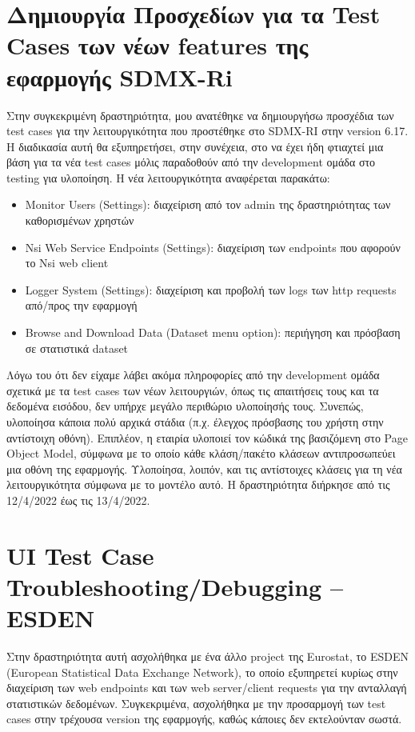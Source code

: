 \section*{Δημιουργία Προσχεδίων για τα Test Cases των νέων features της εφαρμογής SDMX-Ri}
Στην συγκεκριμένη δραστηριότητα, μου ανατέθηκε να δημιουργήσω προσχέδια των test cases για την λειτουργικότητα που προστέθηκε στο SDMX-RI στην 
version 6.17. Η διαδικασία αυτή θα εξυπηρετήσει, στην συνέχεια, στο να έχει ήδη φτιαχτεί μια βάση για τα νέα test cases μόλις παραδοθούν από 
την development ομάδα στο testing για υλοποίηση. Η νέα λειτουργικότητα αναφέρεται παρακάτω:
\begin{itemize}
    \item Monitor Users (Settings): διαχείριση από τον admin της δραστηριότητας των καθορισμένων χρηστών
    \item Nsi Web Service Endpoints (Settings): διαχείριση των endpoints που αφορούν το Nsi web client
	\item Logger System (Settings): διαχείριση και προβολή των logs των http requests από/προς την εφαρμογή
	\item Browse and Download Data (Dataset menu option): περιήγηση και πρόσβαση σε στατιστικά dataset
\end{itemize}
Λόγω του ότι δεν είχαμε λάβει ακόμα πληροφορίες από την development ομάδα σχετικά με τα test cases των νέων λειτουργιών, όπως τις απαιτήσεις 
τους και τα δεδομένα εισόδου, δεν υπήρχε μεγάλο περιθώριο υλοποίησής τους. Συνεπώς, υλοποίησα κάποια πολύ αρχικά στάδια (π.χ. έλεγχος πρόσβασης 
του χρήστη στην αντίστοιχη οθόνη). Επιπλέον, η εταιρία υλοποιεί τον κώδικά της βασιζόμενη στο Page Object Model, σύμφωνα με το οποίο κάθε 
κλάση/πακέτο κλάσεων αντιπροσωπεύει μια οθόνη της εφαρμογής. Υλοποίησα, λοιπόν, και τις αντίστοιχες κλάσεις για τη νέα λειτουργικότητα σύμφωνα 
με το μοντέλο αυτό. Η δραστηριότητα διήρκησε από τις 12/4/2022 έως τις 13/4/2022.

\section*{UI Test Case Troubleshooting/Debugging – ESDEN}
Στην δραστηριότητα αυτή ασχολήθηκα με ένα άλλο project της Eurostat, το ESDEN (European Statistical Data Exchange Network), το οποίο εξυπηρετεί 
κυρίως στην διαχείριση των web endpoints και των web server/client requests για την ανταλλαγή στατιστικών δεδομένων. Συγκεκριμένα, ασχολήθηκα 
με την προσαρμογή των test cases στην τρέχουσα version της εφαρμογής, καθώς κάποιες δεν εκτελούνταν σωστά. \\

